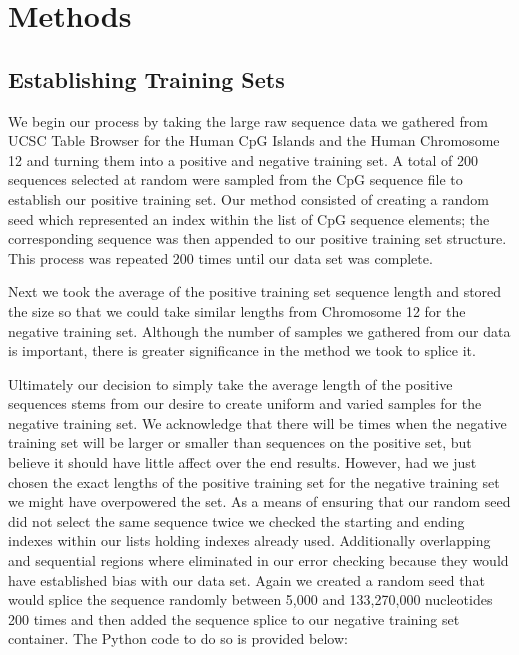\documentclass[paper=letter, fontsize=12pt]{article}
\begin{document}
\section{Methods}

\subsection{Establishing Training Sets}
We begin our process by taking the large raw sequence data we gathered from UCSC Table Browser for the Human CpG Islands and the Human Chromosome 12 and turning them into a positive and negative training set. A total of 200 sequences selected at random were sampled from the CpG sequence file to establish our positive training set. Our method consisted of creating a random seed which represented an index within the list of CpG sequence elements; the corresponding sequence was then appended to our positive training set structure. This process was repeated 200 times until our data set was complete.

Next we took the average of the positive training set sequence length and stored the size so that we could take similar lengths from Chromosome 12 for the negative training set. Although the number of samples we gathered from our data is important, there is greater significance in the method we took to splice it.

Ultimately our decision to simply take the average length of the positive sequences stems from our desire to create uniform and varied samples for the negative training set. We acknowledge that there will be times when the negative training set will be larger or smaller than sequences on the positive set, but believe it should have little affect over the end results. However, had we just chosen the exact lengths of the positive training set for the negative training set we might have overpowered the set. As a means of ensuring that our random seed did not select the same sequence twice we checked the starting and ending indexes within our lists holding indexes already used. Additionally overlapping and sequential regions where eliminated in our error checking because they would have established bias with our data set. Again we created a random seed that would splice the sequence randomly between 5,000 and 133,270,000 nucleotides 200 times and then added the sequence splice to our negative training set container. The Python code to do so is provided below: 
\end{document}
